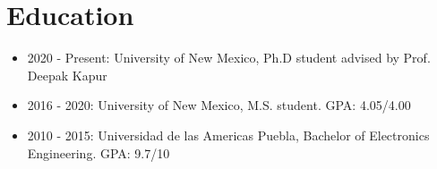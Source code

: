 \section{Education}

\begin{itemize}
\item 2020 - Present: University of New Mexico, Ph.D student advised by
  Prof. Deepak Kapur
\item 2016 - 2020: University of New Mexico, M.S. student. GPA: 4.05/4.00
\item 2010 - 2015: Universidad de las Americas Puebla, Bachelor of
  Electronics Engineering. GPA: 9.7/10
\end{itemize}


